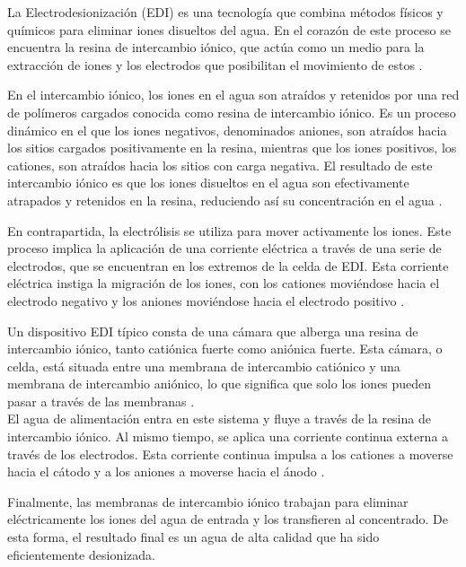 La Electrodesionización (EDI) es una tecnología que combina métodos físicos y químicos para eliminar iones disueltos
del agua. En el corazón de este proceso se encuentra la resina de intercambio iónico, que actúa como un medio para la
extracción de iones y los electrodos que posibilitan el movimiento de estos \cite{condorchemUltrapureWaterElectrodeionization2019}.

En el intercambio iónico, los iones en el agua son atraídos y retenidos por una red de polímeros
cargados conocida como resina de intercambio iónico. Es un proceso dinámico en el que los iones negativos,
denominados aniones, son atraídos hacia los sitios cargados positivamente en la resina, mientras
que los iones positivos, los cationes, son atraídos hacia los sitios con carga negativa.
El resultado de este intercambio iónico es que los iones disueltos en el agua son efectivamente
atrapados y retenidos en la resina, reduciendo así su concentración en el agua \cite{lenntechElectrodeionizationEDI} \cite{condorchemUltrapureWaterElectrodeionization2019}.

En contrapartida, la electrólisis se utiliza para mover activamente los iones. Este proceso
implica la aplicación de una corriente eléctrica a través de una serie de electrodos, que se
encuentran en los extremos de la celda de EDI. Esta corriente eléctrica instiga la migración
de los iones, con los cationes moviéndose hacia el electrodo negativo y los aniones moviéndose
hacia el electrodo positivo \cite{condorchemUltrapureWaterElectrodeionization2019}.

Un dispositivo EDI típico consta de una cámara que alberga una resina de intercambio iónico,
tanto catiónica fuerte como aniónica fuerte. Esta cámara, o celda, está situada entre una membrana
de intercambio catiónico y una membrana de intercambio aniónico, lo que significa que solo
los iones pueden pasar a través de las membranas \cite{alvaradoElectrodeionizationPrinciplesStrategies2014}. \\

El agua de alimentación entra en este sistema y fluye a través de la resina de intercambio
iónico. Al mismo tiempo, se aplica una corriente continua externa a través de los electrodos.
Esta corriente continua impulsa a los cationes a moverse hacia el cátodo y a los aniones a
moverse hacia el ánodo \cite{alvaradoElectrodeionizationPrinciplesStrategies2014}.

Finalmente, las membranas de intercambio iónico trabajan para eliminar eléctricamente los iones del
agua de entrada y los transfieren al concentrado. De esta forma, el resultado final es un agua
de alta calidad que ha sido eficientemente desionizada.

